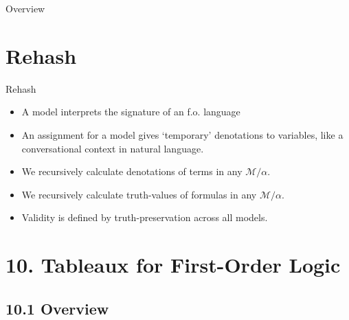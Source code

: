 \begin{frame}
  \setcounter{framenumber}{290}
  \maketitle
\end{frame}

\begin{frame}{Overview}
\tableofcontents
\end{frame}

\section{Rehash}
\begin{frame}{Rehash}
	
	\begin{itemize}
	\itemsep=16pt
	
	\item A model interprets the signature of an f.o. language
		
	\item An assignment for a model gives `temporary' denotations to variables, like a conversational context in natural language. 
	
	\item We recursively calculate denotations of terms in any $\mathcal{M}/\alpha$.
		
	\item We recursively calculate truth-values of formulas in any $\mathcal{M}/\alpha$.
		
	\item Validity is defined by truth-preservation across all models.
					
	\end{itemize}

\end{frame}

\section{10. Tableaux for First-Order Logic}
\subsection{10.1 Overview}

